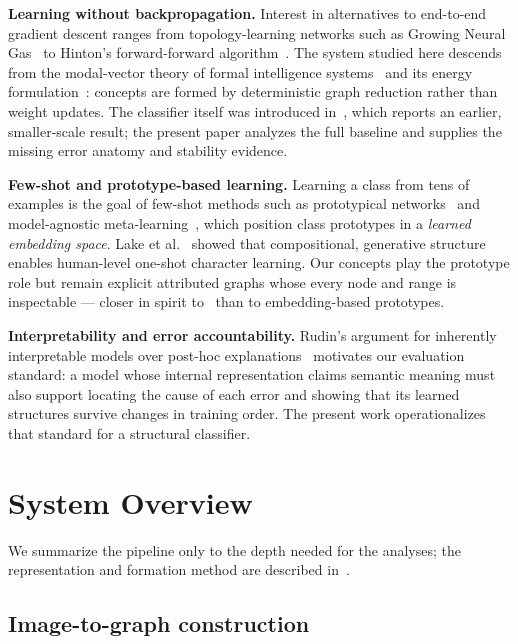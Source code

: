 \documentclass[conference]{IEEEtran}
\begin{document}
\textbf{Learning without backpropagation.} Interest in alternatives to
end-to-end gradient descent ranges from topology-learning networks such as
Growing Neural Gas~\cite{fritzke1995growing} to Hinton's forward-forward
algorithm~\cite{hinton2022forward}. The system studied here descends from
the modal-vector theory of formal intelligence
systems~\cite{parzhyn2013principles,parzhyn2025architecture} and its
energy formulation~\cite{parzhyn2025energy}: concepts are formed by
deterministic graph reduction rather than weight updates. The
classifier itself was introduced in~\cite{lapin2025fewshot}, which reports
an earlier, smaller-scale result; the present paper analyzes the
full baseline and supplies the missing error anatomy and stability
evidence.

\textbf{Few-shot and prototype-based learning.} Learning a class from
tens of examples is the goal of few-shot methods such as prototypical
networks~\cite{snell2017prototypical} and model-agnostic
meta-learning~\cite{finn2017model}, which position class prototypes in a
\emph{learned embedding space}. Lake et al.~\cite{lake2015human} showed
that compositional, generative structure enables human-level one-shot
character learning. Our concepts play the prototype role but remain
explicit attributed graphs whose every node and range is inspectable ---
closer in spirit to~\cite{lake2015human} than to embedding-based
prototypes.

\textbf{Interpretability and error accountability.} Rudin's argument for
inherently interpretable models over post-hoc
explanations~\cite{rudin2019stop} motivates our evaluation standard: a
model whose internal representation claims semantic meaning must also
support locating the cause of each error and showing that its learned
structures survive changes in training order. The present work
operationalizes that standard for a structural classifier.

\section{System Overview}
\label{sec:system}

We summarize the pipeline only to the depth needed for the analyses; the
representation and formation method are described
in~\cite{lapin2025fewshot,parzhyn2025energy}.

\subsection{Image-to-graph construction}
\end{document}
